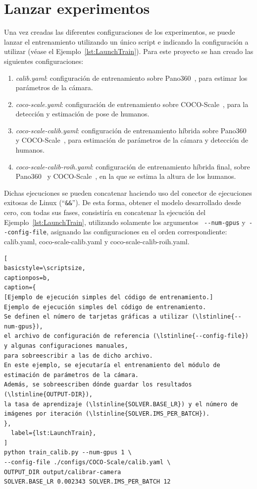 \section{Lanzar experimentos}\label{app:LaunchExperiments}
Una vez creadas las diferentes configuraciones de los experimentos, se puede lanzar el
entrenamiento utilizando un único script e indicando la configuración a utilizar (véase el Ejemplo~\ref{lst:LaunchTrain}). Para
este proyecto se han creado las siguientes configuraciones:
\begin{enumerate}
  \itemsep0cm
  \item \emph{calib.yaml}: configuración de entrenamiento sobre Pano360~\cite{SPEC}, para estimar los parámetros de la cámara.
  \item \emph{coco-scale.yaml}: configuración de entrenamiento sobre COCO-Scale~\cite{SVMIW}, para la detección y estimación de pose de humanos.
  \item \emph{coco-scale-calib.yaml}: configuración de entrenamiento híbrida sobre Pano360~\cite{SPEC} y COCO-Scale~\cite{SVMIW}, para estimación de parámetros de la cámara y detección de humanos.
  \item \emph{coco-scale-calib-roih.yaml}: configuración de entrenamiento híbrida final, sobre Pano360~\cite{SPEC} y COCO-Scale~\cite{SVMIW}, en la que se estima la altura de los humanos.
\end{enumerate}
Dichas ejecuciones se pueden concatenar haciendo uso del conector de ejecuciones exitosas de Linux (``\lstinline{&&}''). De
esta forma, obtener el modelo desarrollado desde cero, con todas sus fases, consistiría en concatenar la ejecución del
Ejemplo~\ref{lst:LaunchTrain}, utilizando solamente los argumentos ~\lstinline{--num-gpus} y~\lstinline{--config-file},
asignando las configuraciones en el orden correspondiente: calib.yaml, coco-scale-calib.yaml y coco-scale-calib-roih.yaml.
\begin{lstlisting}[
basicstyle=\scriptsize,
captionpos=b,
caption={
[Ejemplo de ejecución simples del código de entrenamiento.]
Ejemplo de ejecución simples del código de entrenamiento.
Se definen el número de tarjetas gráficas a utilizar (\lstinline{--num-gpus}),
el archivo de configuración de referencia (\lstinline{--config-file}) y algunas configuraciones manuales,
para sobreescribir a las de dicho archivo.
En este ejemplo, se ejecutaría el entrenamiento del módulo de estimación de parámetros de la cámara.
Además, se sobreescriben dónde guardar los resultados (\lstinline{OUTPUT-DIR}),
la tasa de aprendizaje (\lstinline{SOLVER.BASE_LR}) y el número de imágenes por iteración (\lstinline{SOLVER.IMS_PER_BATCH}).
},
  label={lst:LaunchTrain},
]
python train_calib.py --num-gpus 1 \
--config-file ./configs/COCO-Scale/calib.yaml \
OUTPUT_DIR output/calibrar-camera
SOLVER.BASE_LR 0.002343 SOLVER.IMS_PER_BATCH 12
\end{lstlisting}

